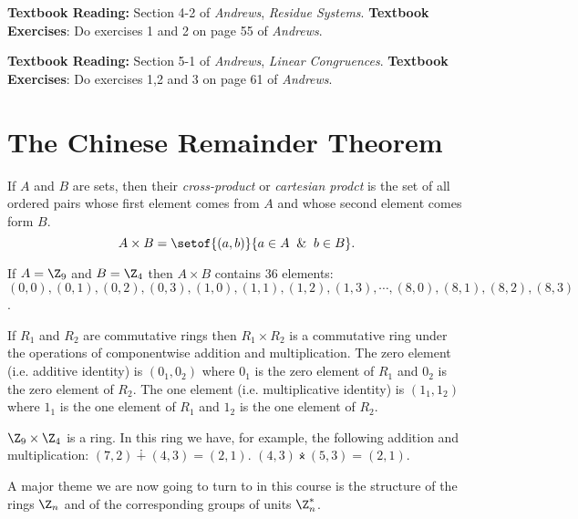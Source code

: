 \documentclass[oneside,12pt]{amsart}
\begin{document}
\bigskip

\textbf{Textbook Reading: } Section 4-2 of \emph{Andrews}, \emph{Residue Systems}.
\textbf{Textbook Exercises}: Do exercises 1 and 2 on page 55 of \emph{Andrews}.

\bigskip

\textbf{Textbook Reading: } Section 5-1 of \emph{Andrews}, \emph{Linear Congruences}.
\textbf{Textbook Exercises}: Do exercises 1,2 and 3 on page 61 of \emph{Andrews}.

\newpage

\section{The Chinese Remainder Theorem}

\begin{definition}
If $A$ and $B$ are sets, then their \emph{cross-product} or \emph{cartesian prodct}
is the set of all ordered pairs whose first element comes from $A$ and whose second
element comes form $B$.
$$A\times B = \setof{(a,b)}{a\in A \And b\in B}.$$
\end{definition}

\begin{example}
If $A=\Z_9$ and $B=\Z_4$ then $A\times B$ contains 36 elements:
$(0,0), (0,1), (0,2), (0,3), (1,0), (1,1), (1,2), (1,3), \cdots , (8,0), (8,1), (8,2), (8,3)$.
\end{example}

\begin{fact}
If $R_1$ and $R_2$ are commutative rings then $R_1\times R_2$ is a commutative ring
under the operations of componentwise addition and multiplication. The
zero element (i.e. additive identity) is $(0_1,0_2)$ where $0_1$ is the zero 
element of $R_1$ and $0_2$ is the zero element of $R_2$. The one element (i.e.
multiplicative identity) is $(1_1,1_2)$ where $1_1$ is the one 
element of $R_1$ and $1_2$ is the one element of $R_2$.
\end{fact}

\begin{example}
$\Z_9 \times \Z_4$ is a ring. In this ring we have, for example, the following
addition and multiplication: $(7,2) \dotplus (4,3) = (2,1)$.
$(4,3) \dottimes (5,3) = (2,1)$.
\end{example}

A major theme we are now going to turn to in this course is the structure of
the rings $\Z_n$ and of the corresponding groups of units $\Z_n^*$.
\end{document}
